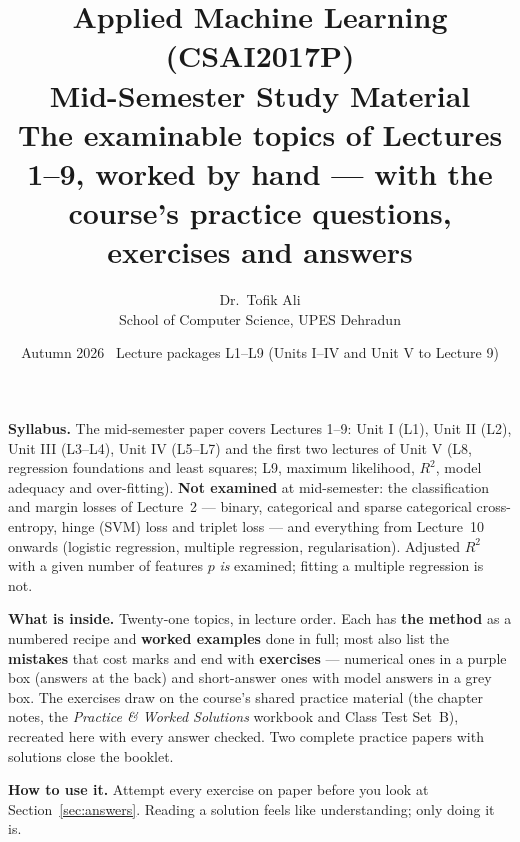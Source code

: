 \documentclass[11pt]{article}
\title{Applied Machine Learning (CSAI2017P)\\
  \large Mid-Semester Study Material\\
  \normalsize The examinable topics of Lectures 1--9, worked by hand ---
  with the course's practice questions, exercises and answers}
\author{Dr.\ Tofik Ali \\ School of Computer Science, UPES Dehradun}
\date{Autumn 2026 \textbullet\ Lecture packages L1--L9 (Units I--IV and Unit V to Lecture 9)}
\begin{document}
\sloppy
\maketitle

\begin{keyidea}
\textbf{Syllabus.} The mid-semester paper covers Lectures 1--9:
Unit I (L1), Unit II (L2), Unit III (L3--L4), Unit IV (L5--L7) and the first
two lectures of Unit V (L8, regression foundations and least squares; L9,
maximum likelihood, $R^2$, model adequacy and over-fitting).
\textbf{Not examined} at mid-semester: the classification and margin losses of
Lecture~2 --- binary, categorical and sparse categorical cross-entropy, hinge
(SVM) loss and triplet loss --- and everything from Lecture~10 onwards
(logistic regression, multiple regression, regularisation). Adjusted $R^2$
with a given number of features $p$ \emph{is} examined; fitting a
multiple regression is not.

\textbf{What is inside.} Twenty-one topics, in lecture order. Each has
\textbf{the method} as a numbered recipe and \textbf{worked examples} done in
full; most also list the \textbf{mistakes} that cost marks and end with
\textbf{exercises} --- numerical ones in a purple box (answers at the back)
and short-answer ones with model answers in a grey box. The exercises draw on the course's shared
practice material (the chapter notes, the \emph{Practice \& Worked Solutions}
workbook and Class Test Set~B), recreated here with every answer checked. Two
complete practice papers with solutions close the booklet.

\textbf{How to use it.} Attempt every exercise on paper before you look at
Section~\ref{sec:answers}. Reading a solution feels like understanding; only
doing it is.
\end{keyidea}
\end{document}
